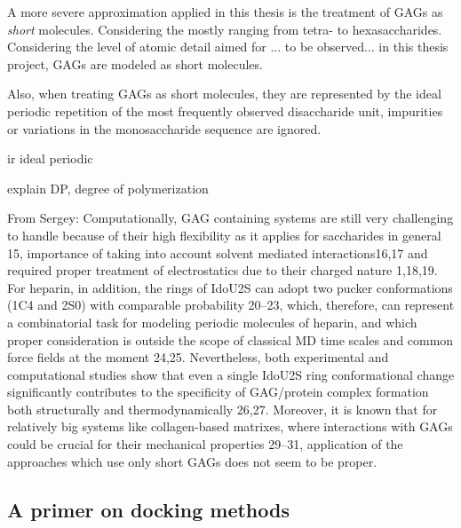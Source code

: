 
A more severe approximation applied in this thesis is the treatment of GAGs as
\textit{short} molecules. Considering the  mostly ranging from tetra- to hexasaccharides. Considering the level of atomic detail aimed for ... to be observed... in this
thesis project, GAGs are modeled as short molecules.


Also, when treating GAGs as short molecules, they are represented by the ideal
periodic repetition of the most frequently observed disaccharide unit,
impurities or variations in the monosaccharide sequence are ignored.

ir ideal periodic

explain DP, degree of polymerization


From Sergey: Computationally, GAG containing systems are still very challenging
to handle because of their high flexibility as it applies for saccharides in
general 15, importance of taking into account solvent mediated interactions16,17
and required proper treatment of electrostatics due to their charged nature
1,18,19. For heparin, in addition, the rings of IdoU2S can adopt two pucker
conformations (1C4 and 2S0) with comparable probability 20–23, which, therefore,
can represent a combinatorial task for modeling periodic molecules of heparin,
and which proper consideration is outside the scope of classical MD time scales
and common force fields at the moment 24,25. Nevertheless, both experimental and
computational studies show that even a single IdoU2S ring conformational change
significantly contributes to the specificity of GAG/protein complex formation
both structurally and thermodynamically 26,27. Moreover, it is known
that for relatively big systems like collagen-based matrixes, where interactions
with GAGs could be crucial for their mechanical properties 29–31, application of
the approaches which use only short GAGs does not seem to be proper.



\subsection{A primer on docking methods}


